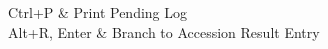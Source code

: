     {\faKeyboardO} Ctrl+P & Print Pending Log\\
    {\faKeyboardO} Alt+R, Enter & Branch to Accession Result Entry \\
